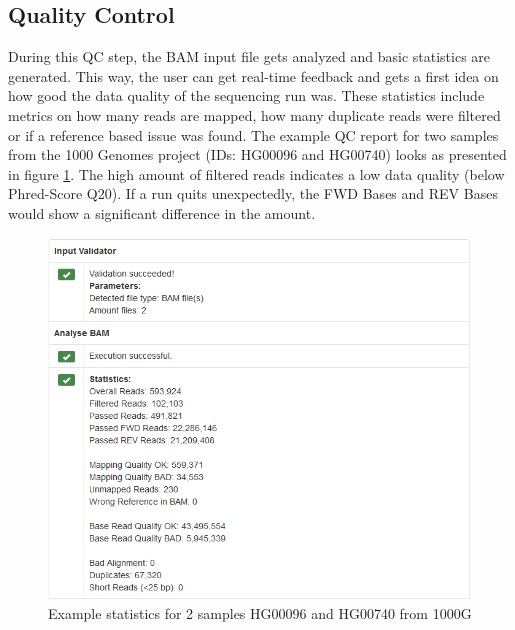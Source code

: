 \subsection{Quality Control}
During this QC step, the BAM input file gets analyzed and basic statistics are generated. This way, the user can get real-time feedback and gets a first idea on how good the data quality of the sequencing run was. These statistics include metrics on how many reads are mapped, how many duplicate reads were filtered or if a reference based issue was found. The example QC report for two samples from the 1000 Genomes project (IDs: HG00096 and HG00740) looks as presented in figure \ref{fig:mtdna-server-qc}. The high amount of filtered reads indicates a low data quality (below Phred-Score Q20). If a run quits unexpectedly, the FWD Bases and REV Bases would show a significant difference in the amount.  
\begin{figure}[!ht]
    \centering
    \includegraphics[width=1\textwidth]{images/mtdna-server-qc.png}
    \caption[Example statistics for 2 samples from 1000G]{Example statistics for 2 samples HG00096 and HG00740 from 1000G}
    \label{fig:mtdna-server-qc}
\end{figure}
